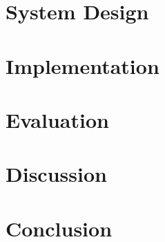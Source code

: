 \documentclass[sigconf,authordraft]{acmart}
\begin{document}
\section{System Design}

\section{Implementation}

\section{Evaluation}

\section{Discussion}

\section{Conclusion}



\end{document}

